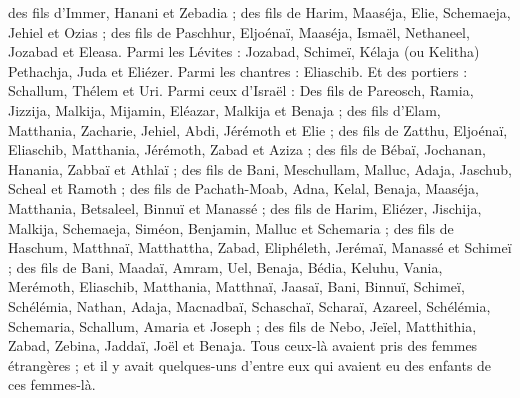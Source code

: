 \begin{multicols}{2}
des fils d'Immer, Hanani et Zebadia ;
des fils de Harim, Maaséja, Elie, Schemaeja, Jehiel et Ozias ;
des fils de Paschhur, Eljoénaï, Maaséja, Ismaël, Nethaneel, Jozabad et Eleasa.
Parmi les Lévites : Jozabad, Schimeï, Kélaja (ou Kelitha) Pethachja, Juda et Eliézer.
Parmi les chantres : Eliaschib. Et des portiers : Schallum, Thélem et Uri.
Parmi ceux d'Israël : Des fils de Pareosch, Ramia, Jizzija, Malkija, Mijamin, Eléazar, Malkija et Benaja ;
des fils d'Elam, Matthania, Zacharie, Jehiel, Abdi, Jérémoth et Elie ;
des fils de Zatthu, Eljoénaï, Eliaschib, Matthania, Jérémoth, Zabad et Aziza ;
des fils de Bébaï, Jochanan, Hanania, Zabbaï et Athlaï ;
des fils de Bani, Meschullam, Malluc, Adaja, Jaschub, Scheal et Ramoth ;
des fils de Pachath-Moab, Adna, Kelal, Benaja, Maaséja, Matthania, Betsaleel, Binnuï et Manassé ;
des fils de Harim, Eliézer, Jischija, Malkija, Schemaeja, Siméon,
Benjamin, Malluc et Schemaria ;
des fils de Haschum, Matthnaï, Matthattha, Zabad, Eliphéleth, Jerémaï, Manassé et Schimeï ;
des fils de Bani, Maadaï, Amram, Uel,
Benaja, Bédia, Keluhu,
Vania, Merémoth, Eliaschib,
Matthania, Matthnaï, Jaasaï,
Bani, Binnuï, Schimeï,
Schélémia, Nathan, Adaja,
Macnadbaï, Schaschaï, Scharaï,
Azareel, Schélémia, Schemaria,
Schallum, Amaria et Joseph ;
des fils de Nebo, Jeïel, Matthithia, Zabad, Zebina, Jaddaï, Joël et Benaja.
Tous ceux-là avaient pris des femmes étrangères ; et il y avait quelques-uns d'entre eux qui avaient eu des enfants de ces femmes-là.
\PPE{}
\end{multicols}
